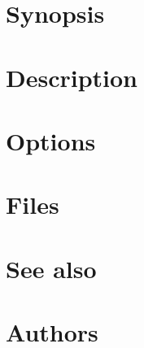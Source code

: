 \documentclass{book}
\begin{document}
\section{Synopsis}


\section{Description}


\section{Options}


\section{Files}


\section{See also}


\section{Authors}

\end{document}
